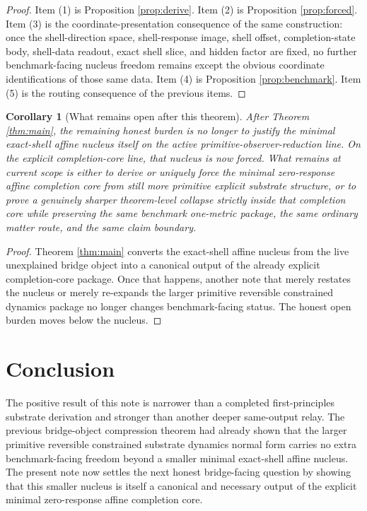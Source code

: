 \documentclass[11pt]{article}
\newtheorem{corollary}{Corollary}
\begin{document}
\begin{proof}
Item (1) is Proposition \ref{prop:derive}. Item (2) is Proposition \ref{prop:forced}. Item (3) is the coordinate-presentation consequence of the same construction: once the shell-direction space, shell-response image, shell offset, completion-state body, shell-data readout, exact shell slice, and hidden factor are fixed, no further benchmark-facing nucleus freedom remains except the obvious coordinate identifications of those same data. Item (4) is Proposition \ref{prop:benchmark}. Item (5) is the routing consequence of the previous items.
\end{proof}

\begin{corollary}[What remains open after this theorem]
\label{cor:next}
After Theorem \ref{thm:main}, the remaining honest burden is no longer to justify the minimal exact-shell affine nucleus itself on the active primitive-observer-reduction line. On the explicit completion-core line, that nucleus is now forced. What remains at current scope is either to derive or uniquely force the minimal zero-response affine completion core from still more primitive explicit substrate structure, or to prove a genuinely sharper theorem-level collapse strictly inside that completion core while preserving the same benchmark one-metric package, the same ordinary matter route, and the same claim boundary.
\end{corollary}

\begin{proof}
Theorem \ref{thm:main} converts the exact-shell affine nucleus from the live unexplained bridge object into a canonical output of the already explicit completion-core package. Once that happens, another note that merely restates the nucleus or merely re-expands the larger primitive reversible constrained dynamics package no longer changes benchmark-facing status. The honest open burden moves below the nucleus.
\end{proof}

\section{Conclusion}

The positive result of this note is narrower than a completed first-principles substrate derivation and stronger than another deeper same-output relay. The previous bridge-object compression theorem had already shown that the larger primitive reversible constrained substrate dynamics normal form carries no extra benchmark-facing freedom beyond a smaller minimal exact-shell affine nucleus. The present note now settles the next honest bridge-facing question by showing that this smaller nucleus is itself a canonical and necessary output of the explicit minimal zero-response affine completion core.
\end{document}
